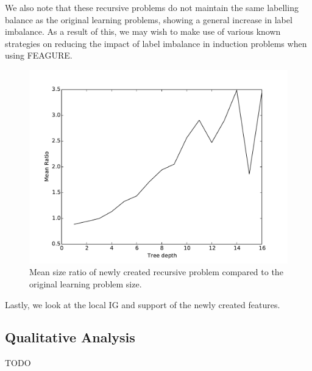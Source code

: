 \documentclass[twoside,11pt]{article}
\theoremstyle{definition}
\begin{document}
We also note that these recursive problems do not maintain the same labelling balance as the original learning problems, showing a general increase in label imbalance. As a result of this, we may wish to make use of various known strategies on reducing the impact of label imbalance in induction problems when using FEAGURE.

\begin{figure}
	\centering
	\includegraphics[width=0.8\linewidth]{problem_ratio}
	\caption{Mean size ratio of newly created recursive problem compared to the original learning problem size.}
	\label{fig:problem_ratio}
\end{figure}

Lastly, we look at the local IG and support of the newly created features.


\subsection{Qualitative Analysis}

TODO


\end{document}
